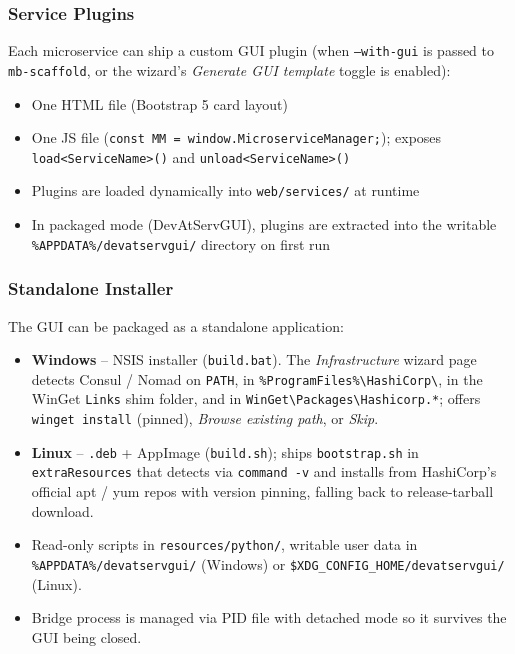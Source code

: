 \subsubsection{Service Plugins}

Each microservice can ship a custom GUI plugin (when \texttt{--with-gui} is passed to
\texttt{mb-scaffold}, or the wizard's \emph{Generate GUI template} toggle is enabled):

\begin{itemize}
   \item One HTML file (Bootstrap 5 card layout)
   \item One JS file (\texttt{const MM = window.MicroserviceManager;}); exposes
         \texttt{load<ServiceName>()} and \texttt{unload<ServiceName>()}
   \item Plugins are loaded dynamically into \texttt{web/services/} at runtime
   \item In packaged mode (DevAtServGUI), plugins are extracted into the writable
         \texttt{\%APPDATA\%/devatservgui/} directory on first run
\end{itemize}

\subsubsection{Standalone Installer}

The GUI can be packaged as a standalone application:

\begin{itemize}
   \item \textbf{Windows} -- NSIS installer (\texttt{build.bat}).  The
         \emph{Infrastructure} wizard page detects Consul / Nomad on \texttt{PATH}, in
         \texttt{\%ProgramFiles\%\textbackslash HashiCorp\textbackslash}, in the
         WinGet \texttt{Links} shim folder, and in
         \texttt{WinGet\textbackslash Packages\textbackslash Hashicorp.*}; offers
         \texttt{winget install} (pinned), \emph{Browse existing path}, or \emph{Skip}.
   \item \textbf{Linux} -- \texttt{.deb} + AppImage (\texttt{build.sh}); ships
         \texttt{bootstrap.sh} in \texttt{extraResources} that detects via
         \texttt{command -v} and installs from HashiCorp's official apt / yum repos
         with version pinning, falling back to release-tarball download.
   \item Read-only scripts in \texttt{resources/python/}, writable user data in
         \texttt{\%APPDATA\%/devatservgui/} (Windows) or \texttt{\$XDG\_CONFIG\_HOME/devatservgui/}
         (Linux).
   \item Bridge process is managed via PID file with detached mode so it survives
         the GUI being closed.
\end{itemize}

